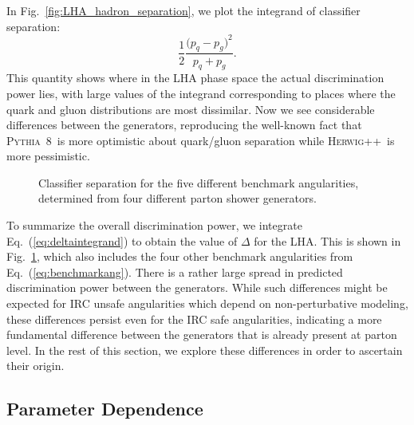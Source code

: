 \documentclass[11pt,letterpaper]{article}
\newcommand{\pythia}{\textsc{Pythia~8}\xspace}
\newcommand{\herwig}{\textsc{Herwig++}\xspace}
\DeclareRobustCommand{\Fig}[1]{Fig.~\ref{#1}}
\DeclareRobustCommand{\Eq}[1]{Eq.~(\ref{#1})}
\newcommand{\be}{\begin{equation}}
\newcommand{\ee}{\end{equation}}
\begin{document}
In \Fig{fig:LHA_hadron_separation}, we plot the integrand of classifier separation:
\be
\label{eq:deltaintegrand}
\frac{1}{2} \frac{\bigl(p_q - p_g\bigr)^2}{p_q + p_g}.
\ee
This quantity shows where in the LHA phase space the actual discrimination power lies, with large values of the integrand corresponding to places where the quark and gluon distributions are most dissimilar.  Now we see considerable differences between the generators, reproducing the well-known fact that \pythia\ is more optimistic about quark/gluon separation while \herwig\ is more pessimistic.

\begin{figure}
\centering
{}
\caption{Classifier separation for the five different benchmark angularities, determined from four different parton shower generators.}
\label{fig:summary_hadron_all}
\end{figure}

To summarize the overall discrimination power, we integrate \Eq{eq:deltaintegrand} to obtain the value of $\Delta$ for the LHA.  This is shown in \Fig{fig:summary_hadron_all}, which also includes the four other benchmark angularities from \Eq{eq:benchmarkang}.  There is a rather large spread in predicted discrimination power between the generators.  While such differences might be expected for IRC unsafe angularities which depend on non-perturbative modeling, these differences persist even for the IRC safe angularities, indicating a more fundamental difference between the generators that is already present at parton level.  In the rest of this section, we explore these differences in order to ascertain their origin.

\subsection{Parameter Dependence}
\label{sec:ee_scales}
\end{document}
